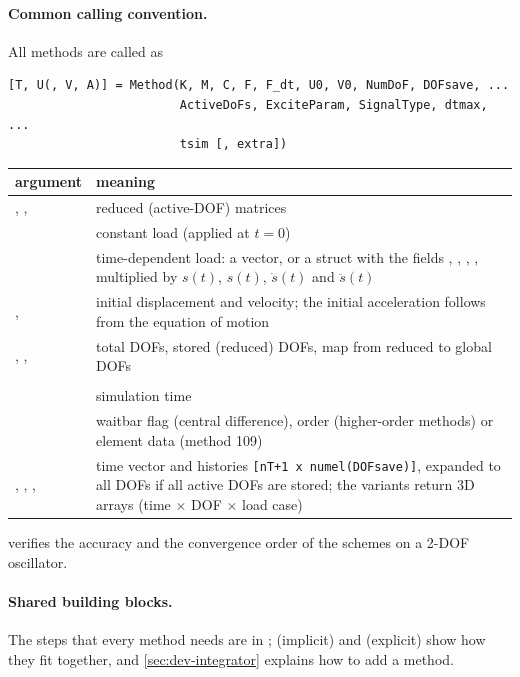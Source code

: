 \paragraph{Common calling convention.} All methods are called as
\begin{lstlisting}
[T, U(, V, A)] = Method(K, M, C, F, F_dt, U0, V0, NumDoF, DOFsave, ...
                        ActiveDoFs, ExciteParam, SignalType, dtmax, ...
                        tsim [, extra])
\end{lstlisting}

\begin{xltabular}{\linewidth}{@{}P{4.2cm}L@{}}
  \toprule
  argument & meaning \\
  \midrule
  , ,  & reduced (active-DOF) matrices \\
   & constant load (applied at $t = 0$) \\
   & time-dependent load: a vector, or a struct with the fields
    , , , , multiplied by $s(t)$,
    $s(t)$, $\dot s(t)$ and $\ddot s(t)$ \\
  ,  & initial displacement and velocity; the initial
    acceleration follows from the equation of motion \\
  , ,  & total DOFs, stored (reduced)
    DOFs, map from reduced to global DOFs \\
   &  \\
   & simulation time \\
   & waitbar flag (central difference), order (higher-order
    methods) or element data (method 109) \\
  , , ,  & time vector and histories
    \texttt{[nT+1 x numel(DOFsave)]}, expanded to all DOFs if all active DOFs are
    stored; the  variants return 3D arrays (time $\times$ DOF
    $\times$ load case) \\
  \bottomrule
\end{xltabular}
 verifies the accuracy and the
convergence order of the schemes on a 2-DOF oscillator.

\paragraph{Shared building blocks.} The steps that every method needs are in
;  (implicit) and
 (explicit) show how they fit together, and
\cref{sec:dev-integrator} explains how to add a method.


